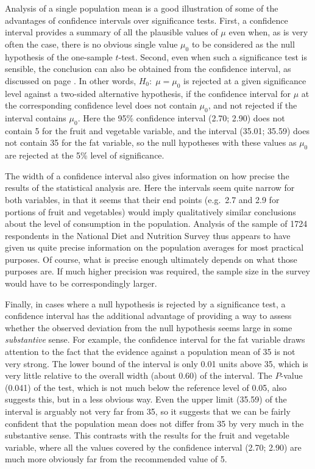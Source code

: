 Analysis of a single population mean is a good illustration of some of
the advantages of confidence intervals over significance tests. First, a
confidence interval provides a summary of all the plausible values of $\mu$
even when, as is very often the case, there is no obvious single value
$\mu_{0}$ to be considered as the null hypothesis of the one-sample
$t$-test. Second, even when such a significance test is sensible, the
conclusion can also be obtained from the confidence interval, as
discussed on page \pageref{p_civstest}. In other words, $H_{0}:\;
\mu=\mu_{0}$ is rejected at a given significance level against a
two-sided alternative hypothesis, if the confidence interval for $\mu$
at the corresponding confidence level does not contain $\mu_{0}$, and
not rejected if the interval contains $\mu_{0}$. Here the 95\%
confidence interval (2.70; 2.90) does not contain 5 for the fruit and
vegetable variable, and the interval (35.01; 35.59) does not contain 35
for the fat variable, so the null hypotheses with these values as
$\mu_{0}$ are rejected at the 5\% level of significance.

The width of a confidence interval also
gives information on how precise the results of the statistical analysis
are. Here the intervals seem quite narrow for both variables, in that it
seems that their end points (e.g.\ 2.7 and 2.9 for
portions of fruit and vegetables) would imply qualitatively similar
conclusions about the level of consumption in the population.
Analysis of the sample of 1724 respondents
in the National Diet and Nutrition Survey thus appears to have given us
quite precise information on the population averages for most practical
purposes. Of course, what is precise enough ultimately depends on what
those purposes are. If much higher precision was required, the sample
size in the survey would have to be correspondingly larger.

Finally, in cases where a null hypothesis is rejected by a significance
test, a confidence interval has the additional advantage of providing a
way to assess whether the observed deviation from the null hypothesis
seems large in some \emph{substantive} sense.
For example, the
confidence interval for the fat variable draws attention to the fact
that the evidence against a population mean of 35 is not very strong.
The lower bound of the interval is only 0.01 units above 35, which is
very little relative to the overall width (about 0.60) of the interval.
The $P$-value (0.041) of the test, which is not much below the reference
level of 0.05, also suggests this, but in a less obvious way. Even the
upper limit (35.59) of the interval is arguably not very far from 35, so
it suggests that we can be fairly confident that the population mean
does not differ from 35 by very much in the substantive sense. This
contrasts with the results for the fruit and vegetable variable, where
all the values covered by the confidence interval (2.70; 2.90) are much
more obviously far from the recommended value of 5.

